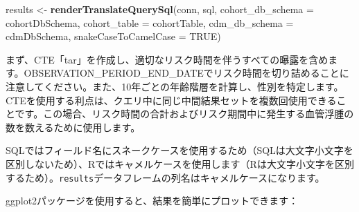 \documentclass[
  11pt]{book}
\newenvironment{Shaded}{\begin{snugshade}}{\end{snugshade}}
\newcommand{\AttributeTok}[1]{\textcolor[rgb]{0.13,0.29,0.53}{#1}}
\newcommand{\CommentTok}[1]{\textcolor[rgb]{0.56,0.35,0.01}{\textit{#1}}}
\newcommand{\ConstantTok}[1]{\textcolor[rgb]{0.56,0.35,0.01}{#1}}
\newcommand{\DecValTok}[1]{\textcolor[rgb]{0.00,0.00,0.81}{#1}}
\newcommand{\FunctionTok}[1]{\textcolor[rgb]{0.13,0.29,0.53}{\textbf{#1}}}
\newcommand{\NormalTok}[1]{#1}
\newcommand{\OtherTok}[1]{\textcolor[rgb]{0.56,0.35,0.01}{#1}}
\newcommand{\SpecialCharTok}[1]{\textcolor[rgb]{0.81,0.36,0.00}{\textbf{#1}}}
\newcommand{\StringTok}[1]{\textcolor[rgb]{0.31,0.60,0.02}{#1}}
\theoremstyle{definition}
\theoremstyle{definition}
\theoremstyle{definition}
\theoremstyle{definition}
\theoremstyle{remark}
\begin{document}
\begin{Shaded}
\begin{Highlighting}[]
\NormalTok{results }\OtherTok{\textless{}{-}} \FunctionTok{renderTranslateQuerySql}\NormalTok{(conn, sql,}
                                   \AttributeTok{cohort\_db\_schema =}\NormalTok{ cohortDbSchema,}
                                   \AttributeTok{cohort\_table =}\NormalTok{ cohortTable,}
                                   \AttributeTok{cdm\_db\_schema =}\NormalTok{ cdmDbSchema,}
                                   \AttributeTok{snakeCaseToCamelCase =} \ConstantTok{TRUE}\NormalTok{)}
\end{Highlighting}
\end{Shaded}

まず、CTE「tar」を作成し、適切なリスク時間を伴うすべての曝露を含めます。OBSERVATION\_PERIOD\_END\_DATEでリスク時間を切り詰めることに注意してください。また、10年ごとの年齢階層を計算し、性別を特定します。CTEを使用する利点は、クエリ中に同じ中間結果セットを複数回使用できることです。この場合、リスク時間の合計およびリスク期間中に発生する血管浮腫の数を数えるために使用します。

SQLではフィールド名にスネークケースを使用するため（SQLは大文字小文字を区別しないため）、Rではキャメルケースを使用します（Rは大文字小文字を区別するため）。\texttt{results}データフレームの列名はキャメルケースになります。

ggplot2パッケージを使用すると、結果を簡単にプロットできます：

\begin{Shaded}
\end{Shaded}
\end{document}
